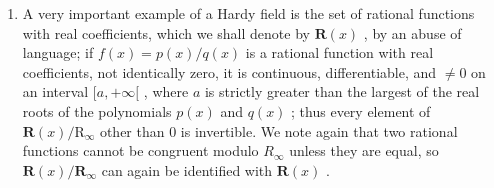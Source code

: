 \begin{enumerate}
\def\labelenumi{\arabic{enumi})}
\setcounter{enumi}{1}
\tightlist
\item
  A very important example of a Hardy field is the set of rational functions with real coefficients, which we shall denote by \(\mathbf{R}(x)\) , by an abuse of language; if \(f(x) = p(x)/q(x)\) is a rational function with real coefficients, not identically zero, it is continuous, differentiable, and \(\neq 0\) on an interval \([a, +\infty[\) , where \(a\) is strictly greater than the largest of the real roots of the polynomials \(p(x)\) and \(q(x)\) ; thus every element of \(\mathbf{R}(x)/\mathrm{R}_{\infty}\) other than 0 is invertible. We note again that two rational functions cannot be congruent modulo \(R_{\infty}\) unless they are equal, so \(\mathbf{R}(x)/\mathbf{R}_{\infty}\) can again be identified with \(\mathbf{R}(x)\) .
\end{enumerate}

